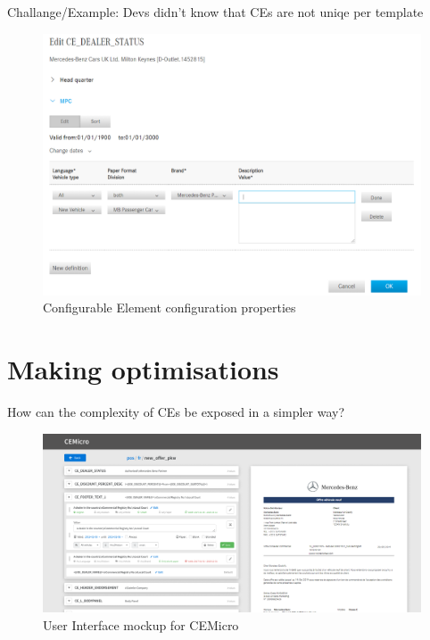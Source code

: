 Challange/Example: Devs didn't know that CEs are not uniqe per template

\begin{figure}
  \centering
  \includegraphics[width=0.8\linewidth]{assets/pos-ce-config-4.png}
  \caption{Configurable Element configuration properties}
  \label{fig:ce-properties}
\end{figure}


\section{Making optimisations}

How can the complexity of CEs be exposed in a simpler way?

\begin{figure}
  \centering
  \includegraphics[width=\linewidth]{assets/cemicro-ui-mockup.png}
  \caption{User Interface mockup for CEMicro}
  \label{fig:mockup}
\end{figure}


